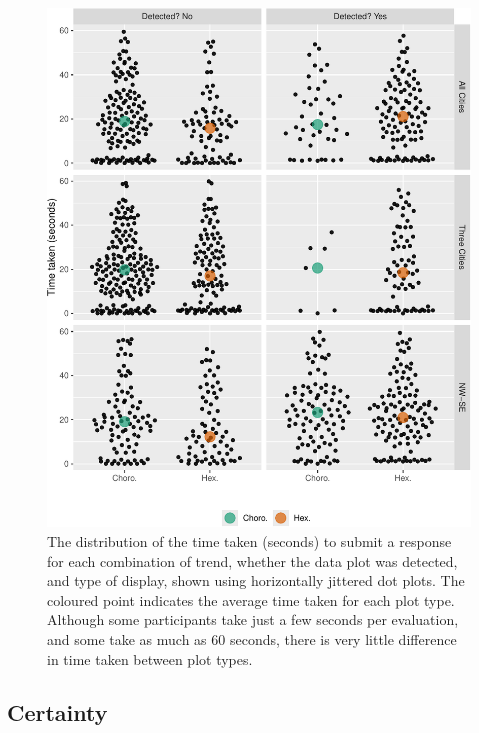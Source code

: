 \documentclass[times, doublespace]{anzsauth}
\begin{document}
\begin{figure}
\includegraphics[width=1\linewidth]{paper_files/figure-latex/beeswarm-1} \caption{The distribution of the time taken (seconds) to submit a response for each combination of trend, whether the data plot was detected, and type of display, shown using horizontally jittered dot plots. The coloured point indicates the average time taken for each plot type. Although some participants take just a few seconds per evaluation, and some take as much as 60 seconds, there is very little difference in time taken between plot types.}\label{fig:beeswarm}
\end{figure}

\subsection{Certainty}\label{certainty}
\end{document}
